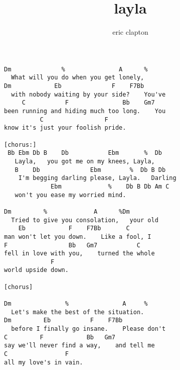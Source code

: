 \author{eric clapton}
\title{layla}
\maketitle
\begin{verbatim}
Dm              %               A      %
  What will you do when you get lonely, 
Dm            Eb              F    F7Bb      
  with nobody waiting by your side?    You've
     C           F               Bb    Gm7   
been running and hiding much too long.    You
          C                 F     
know it's just your foolish pride.

[chorus:]
 Bb Ebm Db B    Db           Ebm       %  Db
   Layla,   you got me on my knees, Layla,  
   B    Db              Ebm        %  Db B Db
    I'm begging darling please, Layla.   Darling
             Ebm             %    Db B Db Am C
   won't you ease my worried mind.        

Dm         %             A      %Dm        
  Tried to give you consolation,   your old
    Eb            F    F7Bb       C      
man won't let you down.    Like a fool, I
F                 Bb   Gm7           C    
fell in love with you,    turned the whole
             F    
world upside down.

[chorus]

Dm               %               A     %
  Let's make the best of the situation. 
Dm         Eb           F    F7Bb            
  before I finally go insane.    Please don't
C         F            Bb   Gm7           
say we'll never find a way,    and tell me
C                F    
all my love's in vain.
\end{verbatim}